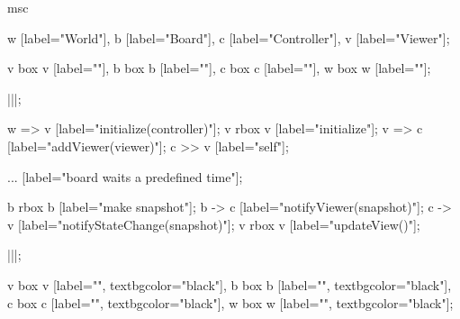 \begin{msc}
msc
{

w [label="World"],
b [label="Board"],
c [label="Controller"],
v [label="Viewer"];

v box v [label=""],
b box b [label=""],
c box c [label=""],
w box w [label=""];

|||;

w => v [label="initialize(controller)"];
v rbox v [label="initialize"];
v => c [label="addViewer(viewer)"];
c >> v [label="self"];

... [label="board waits a predefined time"];

b rbox b [label="make snapshot"];
b -> c [label="notifyViewer(snapshot)"];
c -> v [label="notifyStateChange(snapshot)"];
v rbox v [label="updateView()"];

|||;

v box v [label="", textbgcolor="black"],
b box b [label="", textbgcolor="black"],
c box c [label="", textbgcolor="black"],
w box w [label="", textbgcolor="black"];

}
\end{msc}
